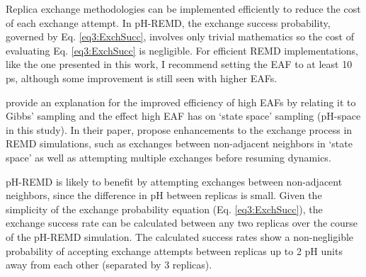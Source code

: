 Replica exchange methodologies can be implemented efficiently to reduce the cost
of each exchange attempt.  In pH-REMD, the exchange success probability,
governed by Eq. \ref{eq3:ExchSucc}, involves only trivial mathematics so the
cost of evaluating Eq. \ref{eq3:ExchSucc} is negligible.  For efficient REMD
implementations, like the one presented in this work, I recommend setting the
EAF to at least 10 ps, although some improvement is still seen with
higher EAFs.

\citeauthor{Chodera_JChemPhys_2011_v135_p194110}
\cite{Chodera_JChemPhys_2011_v135_p194110} provide an explanation for the
improved efficiency of high EAFs by relating it to Gibbs' sampling and the
effect high EAF has on `state space' sampling (pH-space in this study).  In
their paper, \citeauthor{Chodera_JChemPhys_2011_v135_p194110} propose
enhancements to the exchange process in REMD simulations, such as exchanges
between non-adjacent neighbors in `state space' as well as attempting multiple
exchanges before resuming dynamics. \cite{Chodera_JChemPhys_2011_v135_p194110}

pH-REMD is likely to benefit by attempting exchanges between non-adjacent
neighbors, since the difference in pH between replicas is small.  Given the
simplicity of the exchange probability equation (Eq. \ref{eq3:ExchSucc}), the
exchange success rate can be calculated between any two replicas over the course
of the pH-REMD simulation.  The calculated success rates show a non-negligible
probability of accepting exchange attempts between replicas up to 2 pH units
away from each other (\ie separated by 3 replicas).
